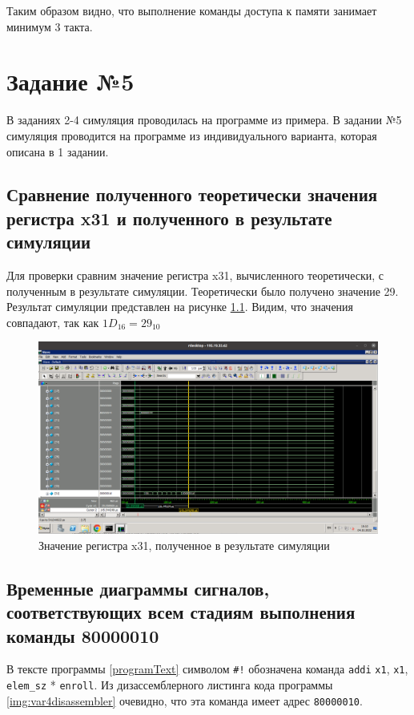 Таким образом видно, что выполнение команды доступа к памяти занимает минимум 3 такта.


\chapter{Задание №5}
В заданиях 2-4 симуляция проводилась на программе из примера. В задании №5 симуляция проводится на программе из индивидуального варианта, которая описана в 1 задании. 

\section{Сравнение полученного теоретически значения регистра x31 и полученного в результате симуляции}
Для проверки сравним значение регистра x31, вычисленного теоретически, с полученным в результате симуляции. Теоретически было получено значение 29. Результат симуляции представлен на рисунке \ref{var4task5_01}. Видим, что значения совпадают, так как ${1D}_{16} = {29}_{10}$

\begin{figure}[h!p]
	\centering
	\includegraphics[width = \linewidth]{img/var4task5_01.png}
	\caption{Значение регистра x31, полученное в результате симуляции}
	\label{var4task5_01}
\end{figure}

\section{Временные диаграммы сигналов, соответствующих всем стадиям выполнения команды 80000010}
В тексте программы \ref{programText} символом \verb|#!| обозначена команда \verb|addi| \verb|x1|, \verb|x1|, \verb|elem_sz| * \verb|enroll|. Из дизассемблерного листинга кода программы \ref{img:var4disassembler} очевидно, что эта команда имеет адрес \verb|80000010|.

